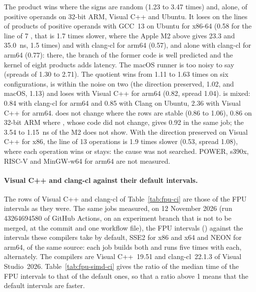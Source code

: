 \noindent
The product wins where the signs are random (1.23 to 3.47 times) and, alone,
of positive operands on 32-bit ARM, Visual C++ and Ubuntu. It loses on the
lines of products of positive operands with GCC~13 on Ubuntu for x86-64 (0.58 for the line
of 7 \code{*}, that is 1.7 times slower, where the Apple M2 above gives 23.3
and 35.0~ns, 1.5 times) and with clang-cl for arm64 (0.57), and alone with
clang-cl for arm64 (0.77): there, the branch of the former code is well
predicted and the kernel of eight products adds latency. The macOS runner is
too noisy to say (spreads of 1.30 to 2.71). The quotient wins from 1.11 to
1.63 times on six configurations, is within the noise on two (the direction
preserved, 1.02, and macOS, 1.13) and loses with Visual C++ for arm64 (0.82,
spread 1.04).  is mixed: 0.84 with clang-cl for arm64 and 0.85
with Clang on Ubuntu, 2.36 with Visual C++ for arm64.  does not
change where the rows are stable (0.86 to 1.06), 0.86 on 32-bit ARM where
, whose code did not change, gives 0.92 in the same job; the 3.54
to 1.15~ns of the M2 does not show. With the direction preserved on Visual
C++ for x86, the line of 13 operations is 1.9 times slower (0.53, spread
1.08), where each operation wins or stays: the cause was not searched. POWER,
s390x, RISC-V and MinGW-w64 for arm64 are not measured.

\medskip
\paragraph{Visual C++ and clang-cl against their default intervals.}
The rows of Visual C++ and clang-cl of Table~\ref{tab:fpu-ci} are those of the
FPU intervals as they were. The same jobs measured, on 12 November 2026 (run
43264694580 of GitHub Actions, on an experiment branch that is not to be
merged, at the commit  and one workflow file), the FPU intervals
() against the intervals these compilers take by
default, SSE2 for x86 and x64 and NEON for arm64, of the same source: each job
builds both and runs  five times with each, alternately.
The compilers are Visual C++~19.51 and clang-cl~22.1.3 of Visual Studio~2026.
Table~\ref{tab:fpu-simd-ci} gives the ratio of the median time of the FPU
intervals to that of the default ones, so that a ratio above 1 means that the
default intervals are faster.

